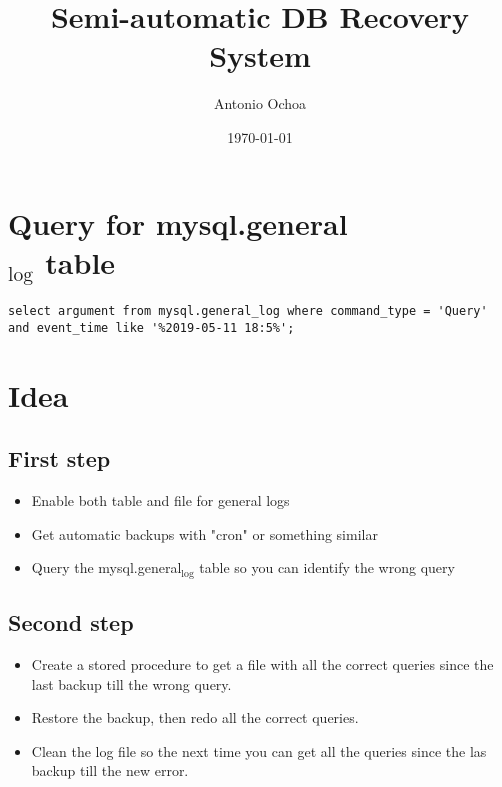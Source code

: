 \documentclass[11pt]{article}
\author{Antonio Ochoa}
\date{\today}
\title{Semi-automatic DB Recovery System}
\begin{document}
\maketitle
\tableofcontents


\section{Query for mysql.general\\$_{\text{log}}$ table}
\label{sec-1}
\begin{verbatim}
select argument from mysql.general_log where command_type = 'Query' and event_time like '%2019-05-11 18:5%';
\end{verbatim}

\section{Idea}
\label{sec-2}
\subsection{First step}
\label{sec-2-1}
\begin{itemize}
\item Enable both table and file for general logs
\item Get automatic backups with "cron" or something similar
\item Query the mysql.general$_{\text{log}}$ table so you can identify the wrong query
\end{itemize}
\subsection{Second step}
\label{sec-2-2}
\begin{itemize}
\item Create a stored procedure to get a file with all the correct queries since
the last backup till the wrong query.
\item Restore the backup, then redo all the correct queries.
\item Clean the log file so the next time you can get all the queries since the
las backup till the new error.
\end{itemize}
\end{document}
